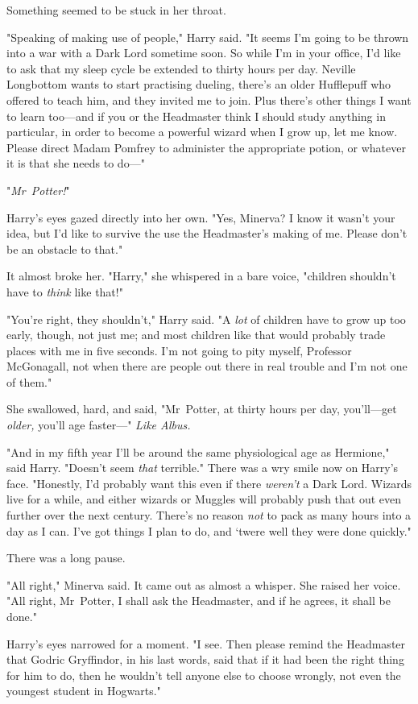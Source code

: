 Something seemed to be stuck in her throat.

"Speaking of making use of people," Harry said. "It seems I’m going to be
thrown into a war with a Dark Lord sometime soon. So while I’m in your office,
I’d like to ask that my sleep cycle be extended to thirty hours per day.
Neville Longbottom wants to start practising dueling, there’s an older
Hufflepuff who offered to teach him, and they invited me to join. Plus there’s
other things I want to learn too—and if you or the Headmaster think I should
study anything in particular, in order to become a powerful wizard when I grow
up, let me know. Please direct Madam Pomfrey to administer the appropriate
potion, or whatever it is that she needs to do—"

"\emph{Mr~Potter!}"

Harry’s eyes gazed directly into her own. "Yes, Minerva? I know it wasn’t your
idea, but I’d like to survive the use the Headmaster’s making of me. Please
don’t be an obstacle to that."

It almost broke her. "Harry," she whispered in a bare voice, "children
shouldn’t have to \emph{think} like that!"

"You’re right, they shouldn’t," Harry said. "A \emph{lot} of children have to
grow up too early, though, not just me; and most children like that would
probably trade places with me in five seconds. I’m not going to pity myself,
Professor McGonagall, not when there are people out there in real trouble and
I’m not one of them."

She swallowed, hard, and said, "Mr~Potter, at thirty hours per day,
you’ll—get \emph{older,} you’ll age faster—" \emph{Like Albus.}

"And in my fifth year I’ll be around the same physiological age as Hermione,"
said Harry. "Doesn’t seem \emph{that} terrible." There was a wry smile now on
Harry’s face. "Honestly, I’d probably want this even if there \emph{weren’t} a
Dark Lord. Wizards live for a while, and either wizards or Muggles will
probably push that out even further over the next century. There’s no reason
\emph{not} to pack as many hours into a day as I can. I’ve got things I plan to
do, and ‘twere well they were done quickly."

There was a long pause.

"All right," Minerva said. It came out as almost a whisper. She raised her
voice. "All right, Mr~Potter, I shall ask the Headmaster, and if he agrees, it
shall be done."

Harry’s eyes narrowed for a moment. "I see. Then please remind the Headmaster
that Godric Gryffindor, in his last words, said that if it had been the right
thing for him to do, then he wouldn’t tell anyone else to choose wrongly, not
even the youngest student in Hogwarts."

